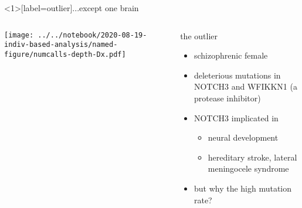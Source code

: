 \documentclass[usenames,dvipsnames]{beamer}
\begin{document}
\begin{frame}<1>[label=outlier]{...except one brain} 
\begin{columns}[t]
\begin{column}{0.6\textwidth}

\texttt{[image: ../../notebook/2020-08-19-indiv-based-analysis/named-figure/numcalls-depth-Dx.pdf]}
\end{column}

\begin{column}{0.5\textwidth}

\begin{center}
the outlier
\end{center}
\begin{itemize}
		\footnotesize
	\item schizophrenic female
	\item<2> deleterious mutations in NOTCH3 and WFIKKN1 (a protease inhibitor)
        \item<2> NOTCH3 implicated in
		\begin{itemize}
			\item neural development
			\item hereditary stroke, lateral meningocele syndrome
		\end{itemize}
	\item<2> but why the high mutation rate?
\end{itemize}
\end{column}
\end{columns}
\end{frame}
\end{document}
